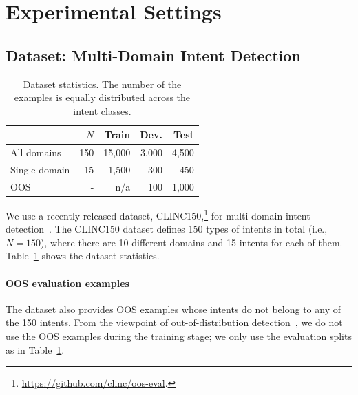\section{Experimental Settings}

\subsection{Dataset: Multi-Domain Intent Detection}

\begin{table}[t]
  \begin{center}
{\small
    \begin{tabular}{l|r||r|r|r}

                  & $N$ & Train & Dev. & Test \\ \hline
    All domains   & 150 & 15,000 & 3,000 & 4,500 \\
    Single domain & 15  & 1,500  & 300   & 450 \\
    OOS           & -   & n/a    & 100   & 1,000 \\ \hline

    \end{tabular}
}
    \caption{Dataset statistics. The number of the examples is equally distributed across the intent classes.}
    \label{tb:dataset}
    \vspace{-1em}
  \end{center}
\end{table}

We use a recently-released dataset, CLINC150,\footnote{\url{https://github.com/clinc/oos-eval}.} for multi-domain intent detection~\citep{oos-intent}.
The CLINC150 dataset defines 150 types of intents in total (i.e., $N=150$), where there are 10 different domains and 15 intents for each of them.
Table~\ref{tb:dataset} shows the dataset statistics.

\paragraph{OOS evaluation examples}
The dataset also provides OOS examples whose intents do not belong to any of the 150 intents.
From the viewpoint of out-of-distribution detection~\citep{softmax_conf,acl-ood}, we do not use the OOS examples during the training stage; we only use the evaluation splits as in Table~\ref{tb:dataset}.

